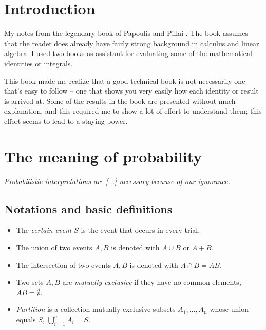 \documentclass[a4paper, oneside]{book}
\begin{document}
\chapter*{Introduction}

My notes from the legendary book of Papoulis and Pillai \cite{papoulis02}. The book assumes that the reader does already have fairly strong background in calculus and linear algebra. I used two books \cite{Gradshteyn80, Abramowitz70} as assistant for evaluating some of the mathematical identities or integrals. 

This book made me realize that a good technical book is not necessarily one that's easy to follow -- one that shows you very easily how each identity or result is arrived at. Some of the results in the book are presented without much explanation, and this required me to show a lot of effort to understand them; this effort seems to lead to a staying power. 


\chapter{The meaning of probability}
\begin{center}
\textit{Probabilistic interpretations are [...] necessary because of our ignorance.}
\end{center}

\section{Notations and basic definitions}
\begin{itemize}
\item The \textit{certain event} $S$ is the event that occurs in every trial.
\item The union of two events $A,B$ is denoted with $A\cup B $ or $A+B$.
\item The intersection of two events $A,B$ is denoted with $A \cap B = AB$. 
\item Two sets $A,B$ are \textit{mutually exclusive} if they have no common elements, \ie $AB = \emptyset$.
\item \textit{Partition} is a collection mutually exclusive subsets $A_1,\hdots,A_n$ whose union equals $S$, \ie $\bigcup\limits_{i=1}^n A_i = S$.
\end{itemize}
\end{document}
